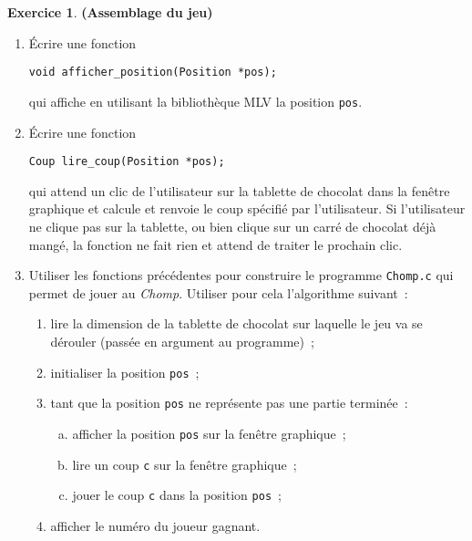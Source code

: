 \documentclass[12pt]{article}
\theoremstyle{definition}
\newtheorem{Exercice}{Exercice}
\begin{document}
\begin{Exercice} {\bf (Assemblage du jeu)}\smallskip
\label{ex:3}

    \begin{enumerate}
        \item Écrire une fonction
\begin{lstlisting}
void afficher_position(Position *pos);
\end{lstlisting}
        qui affiche en utilisant la bibliothèque {\sf MLV} la position 
        {\tt pos}.
        \smallskip

        \item Écrire une fonction
\begin{lstlisting}
Coup lire_coup(Position *pos);
\end{lstlisting}
        qui attend un clic de l'utilisateur sur la tablette de chocolat
        dans la fenêtre graphique et calcule et renvoie le coup spécifié
        par l'utilisateur. Si l'utilisateur ne clique pas sur la tablette,
        ou bien clique sur un carré de chocolat déjà mangé, la fonction
        ne fait rien et attend de traiter le prochain clic.
        \smallskip

        \item Utiliser les fonctions précédentes pour construire le
        programme {\tt Chomp.c} qui permet de jouer au {\em Chomp}.
        Utiliser pour cela l'algorithme suivant~:
        \smallskip

        \begin{enumerate}[(1)]
            \item lire la dimension de la tablette de chocolat sur
            laquelle le jeu va se dérouler (passée en argument au programme)~;
            \item initialiser la position {\tt pos}~;
            \item tant que la position {\tt pos} ne représente pas une
            partie terminée~:
            \begin{enumerate}[(a)]
                \item afficher la position {\tt pos} sur la
                fenêtre graphique~;
                \item lire un coup {\tt c} sur la fenêtre graphique~;
                \item jouer le coup {\tt c} dans la position {\tt pos}~;
            \end{enumerate}
            \item afficher le numéro du joueur gagnant.
        \end{enumerate}
    \end{enumerate}
\end{Exercice}
\bigskip
\end{document}
